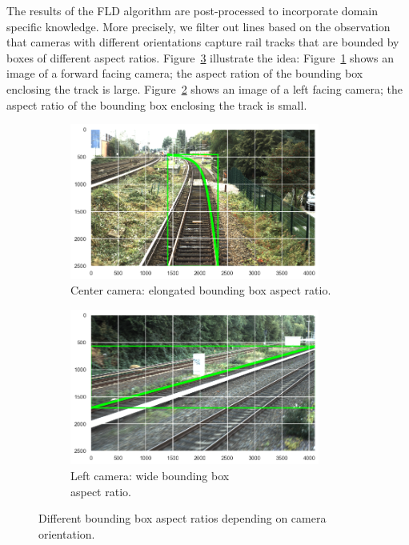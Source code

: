 \documentclass[Master,MDS,english]{BASE/twbook} %
\begin{document}
The results of the FLD algorithm are post-processed to incorporate domain specific knowledge. More precisely, we filter out lines based on the observation that cameras with different orientations capture rail tracks that are bounded by boxes of different aspect ratios. Figure~\ref{fig:bb_examples} illustrate the idea: Figure~\ref{fig:bb_long} shows an image of a forward facing camera; the aspect ration of the bounding box enclosing the track is large.  Figure~\ref{fig:bb_wide} shows an image of a left facing camera; the aspect ratio of the bounding box enclosing the track is small.


\begin{figure}
\centering
\begin{subfigure}[t]{.5\textwidth}
  \centering
  \includegraphics[width=0.9\textwidth]{images/datasets/db/aspect_ratio_long}
  \caption{Center camera: elongated bounding box aspect ratio.}
   \label{fig:bb_long}
\end{subfigure}%
\begin{subfigure}[t]{.5\textwidth}
  \centering
  \includegraphics[width=0.9\textwidth]{images/datasets/db/aspect_ratio_wide}
  \caption{Left camera: wide bounding box \\ aspect ratio. }
  \label{fig:bb_wide}
\end{subfigure}
\caption{Different bounding box aspect ratios depending on camera orientation.}
\label{fig:bb_examples}
\end{figure}
\end{document}
